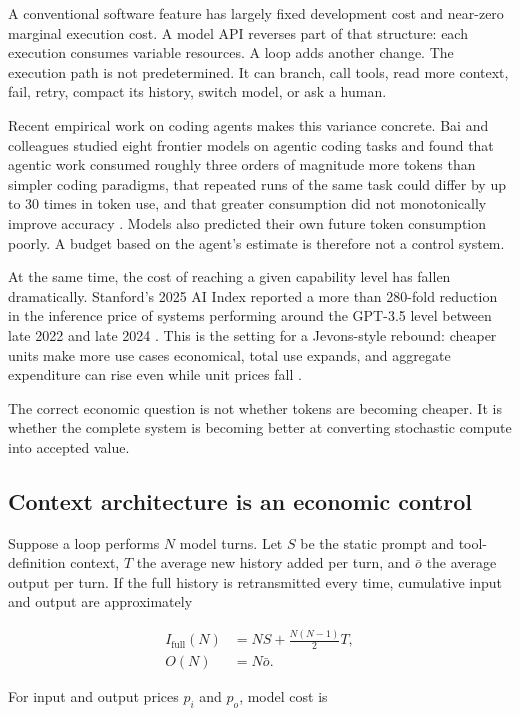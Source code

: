 \documentclass[11pt]{article}
\begin{document}
A conventional software feature has largely fixed development cost and near-zero marginal execution cost. A model API reverses part of that structure: each execution consumes variable resources. A loop adds another change. The execution path is not predetermined. It can branch, call tools, read more context, fail, retry, compact its history, switch model, or ask a human.

Recent empirical work on coding agents makes this variance concrete. Bai and colleagues studied eight frontier models on agentic coding tasks and found that agentic work consumed roughly three orders of magnitude more tokens than simpler coding paradigms, that repeated runs of the same task could differ by up to 30 times in token use, and that greater consumption did not monotonically improve accuracy \cite{bai2026}. Models also predicted their own future token consumption poorly. A budget based on the agent's estimate is therefore not a control system.

At the same time, the cost of reaching a given capability level has fallen dramatically. Stanford's 2025 AI Index reported a more than 280-fold reduction in the inference price of systems performing around the GPT-3.5 level between late 2022 and late 2024 \cite{stanford2025}. This is the setting for a Jevons-style rebound: cheaper units make more use cases economical, total use expands, and aggregate expenditure can rise even while unit prices fall \cite{jevons1866}.

The correct economic question is not whether tokens are becoming cheaper. It is whether the complete system is becoming better at converting stochastic compute into accepted value.

\subsection{Context architecture is an economic control}

Suppose a loop performs $N$ model turns. Let $S$ be the static prompt and tool-definition context, $T$ the average new history added per turn, and $\bar{o}$ the average output per turn. If the full history is retransmitted every time, cumulative input and output are approximately

\begin{align}
I_{\mathrm{full}}(N) &= NS + \frac{N(N-1)}{2}T, \\
O(N) &= N\bar{o}.
\end{align}

For input and output prices $p_i$ and $p_o$, model cost is
\end{document}
